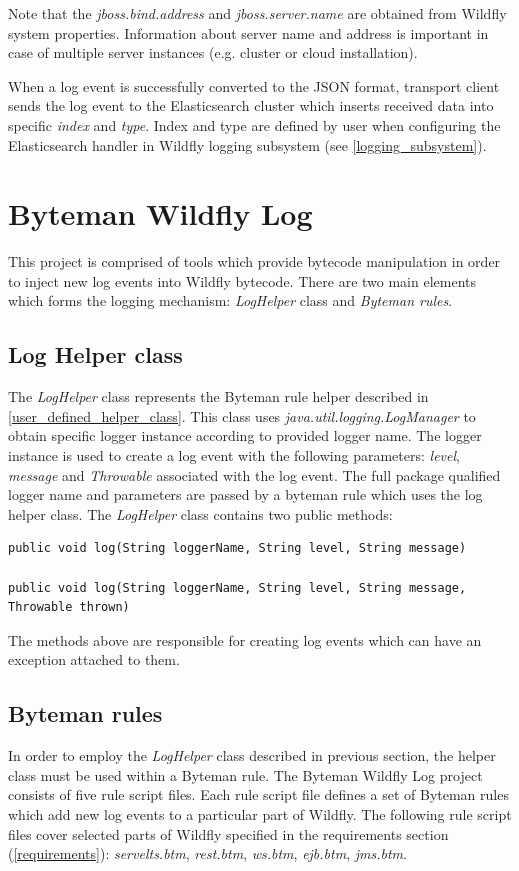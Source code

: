 \documentclass[12pt,oneside]{fithesis2}
\begin{document}
Note that the \textit{jboss.bind.address} and \textit{jboss.server.name} are obtained from Wildfly system properties. Information about server name and address is important in case of multiple server instances (e.g. cluster or cloud installation).

When a log event is successfully converted to the JSON format, transport client sends the log event to the Elasticsearch cluster which inserts received data into specific \textit{index} and \textit{type}. Index and type are defined by user when configuring the Elasticsearch handler in Wildfly logging subsystem (see \ref{logging_subsystem}).

\section{Byteman Wildfly Log}
This project is comprised of tools which provide bytecode manipulation in order to inject new log events into Wildfly bytecode. There are two main elements which forms the logging mechanism: \textit{LogHelper} class and \textit{Byteman rules}.

\subsection{Log Helper class}
\label{log_helper_class}
The \textit{LogHelper} class represents the Byteman rule helper described in \ref{user_defined_helper_class}. This class uses \textit{java.util.logging.LogManager} to obtain specific logger instance according to provided logger name. The logger instance is used to create a log event with the following parameters: \textit{level}, \textit{message} and \textit{Throwable} associated with the log event. The full package qualified logger name and parameters are passed by a byteman rule which uses the log helper class. The \textit{LogHelper} class contains two  public methods:
\begin{lstlisting}[caption = LogHelper methods for creating log events., label = log_helper_methods, style=eclipse_java]
public void log(String loggerName, String level, String message)

public void log(String loggerName, String level, String message, Throwable thrown)
\end{lstlisting}
\noindent
The methods above are responsible for creating log events which can have an exception attached to them.

\subsection{Byteman rules}
In order to employ the \textit{LogHelper} class described in previous section, the helper class must be used within a Byteman rule. The Byteman Wildfly Log project consists of five rule script files. Each rule script file defines a set of Byteman rules which add new log events to a particular part of Wildfly. The following rule script files cover selected parts of Wildfly specified in the requirements section (\ref{requirements}): \textit{servelts.btm}, \textit{rest.btm}, \textit{ws.btm}, \textit{ejb.btm}, \textit{jms.btm}.
\end{document}

